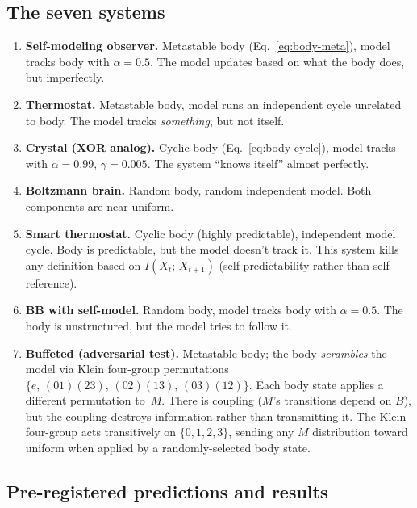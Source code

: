 \documentclass[12pt]{article}
\theoremstyle{remark}
\begin{document}
\subsection{The seven systems}\label{sec:seven}

\begin{enumerate}[leftmargin=2em]
\item \textbf{Self-modeling observer.} Metastable body (Eq.~\ref{eq:body-meta}), model tracks body with $\alpha = 0.5$. The model updates based on what the body does, but imperfectly.

\item \textbf{Thermostat.} Metastable body, model runs an independent cycle unrelated to body. The model tracks \emph{something}, but not itself.

\item \textbf{Crystal (XOR analog).} Cyclic body (Eq.~\ref{eq:body-cycle}), model tracks with $\alpha = 0.99$, $\gamma = 0.005$. The system ``knows itself'' almost perfectly.

\item \textbf{Boltzmann brain.} Random body, random independent model. Both components are near-uniform.

\item \textbf{Smart thermostat.} Cyclic body (highly predictable), independent model cycle. Body is predictable, but the model doesn't track it. This system kills any definition based on $I(X_t;\, X_{t+1})$ (self-predictability rather than self-reference).

\item \textbf{BB with self-model.} Random body, model tracks body with $\alpha = 0.5$. The body is unstructured, but the model tries to follow it.

\item \textbf{Buffeted (adversarial test).} Metastable body; the body \emph{scrambles} the model via Klein four-group permutations $\{e,\, (01)(23),\, (02)(13),\, (03)(12)\}$. Each body state applies a different permutation to~$M$. There is coupling ($M$'s transitions depend on $B$), but the coupling destroys information rather than transmitting it. The Klein four-group acts transitively on $\{0,1,2,3\}$, sending any $M$ distribution toward uniform when applied by a randomly-selected body state.
\end{enumerate}

\subsection{Pre-registered predictions and results}
\end{document}
